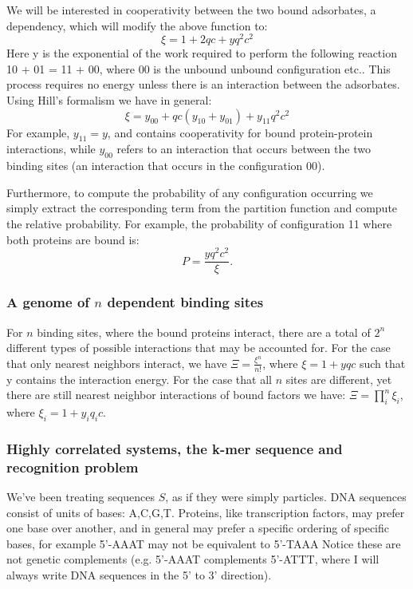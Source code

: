 We will be interested in cooperativity between the two bound adsorbates, a dependency, which will modify the above function to:
\begin{equation}\label{}
  \xi = 1 + 2qc + y q^2 c^2
\end{equation}
Here y is the exponential of the work required to perform the following reaction 10 + 01 = 11 + 00, where 00 is the unbound unbound configuration etc..  This process requires no energy unless there is an interaction between the adsorbates.  Using Hill's formalism we have in general:
\begin{equation}\label{y11}
   \xi = y_{00} + qc(y_{10} + y_{01}) + y_{11}q^2 c^2
\end{equation}
For example, $y_{11}=y$, and contains cooperativity for bound protein-protein interactions, while $y_{00}$ refers to an interaction that occurs between the two binding sites (an interaction that occurs in the configuration 00).

Furthermore, to compute the  probability of any configuration occurring we simply extract the corresponding term from the partition function and compute the relative probability.  For example, the probability of configuration 11 where both proteins are bound is:
 \begin{equation}\label{y11}
   P = \frac{yq^2 c^2}{\xi}.
\end{equation}

\subsubsection{A genome of $n$ dependent binding sites}
For $n$ binding sites, where the bound proteins interact, there are a total of $2^n$ different types of possible interactions that may be accounted for.  For the case that only nearest neighbors interact, we have $\Xi=\frac{\xi^n}{n!}$, where $\xi=1+yqc$ such that y contains the interaction energy.  For the case that all $n$ sites are different, yet there are still nearest neighbor interactions of bound factors we have: $\Xi=\prod_i^n \xi_i$, where $\xi_i=1+y_i q_i c$.

\subsubsection{Highly correlated systems, the k-mer sequence and recognition problem}


We've been treating sequences $S$, as if they were simply particles. DNA sequences consist of units of bases: A,C,G,T.  Proteins, like transcription factors, may prefer one base over another, and in general may prefer a specific ordering of specific bases, for example 5'-AAAT may not be equivalent to 5'-TAAA  Notice these are not genetic complements (e.g. 5'-AAAT complements 5'-ATTT, where I will always write DNA sequences in the 5' to 3' direction). 

